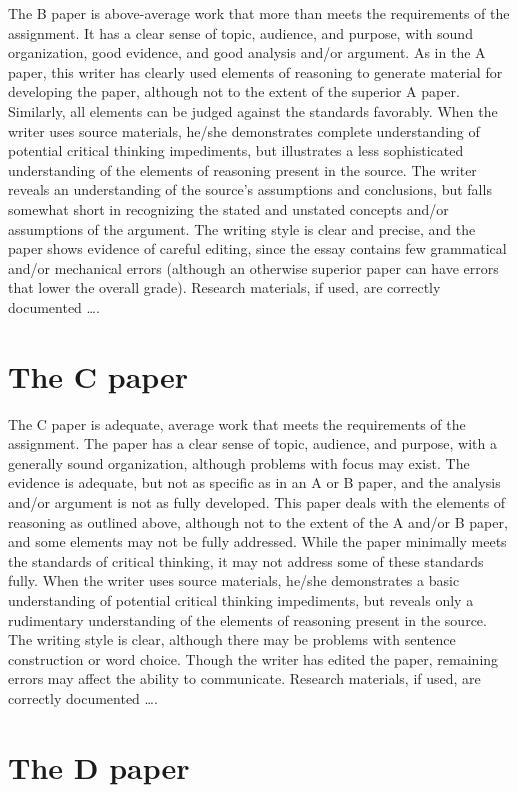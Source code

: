 The B paper is above-average work that more than meets the requirements of the assignment. It has a clear sense of topic, audience, and purpose, with sound organization, good evidence, and good analysis and/or argument. As in the A paper, this writer has clearly used elements of reasoning to generate material for developing the paper, although not to the extent of the superior A paper. Similarly, all elements can be judged against the standards favorably. When the writer uses source materials, he/she demonstrates complete understanding of potential critical thinking impediments, but illustrates a less sophisticated understanding of the elements of reasoning present in the source. The writer reveals an understanding of the source’s assumptions and conclusions, but falls somewhat short in recognizing the stated and unstated concepts and/or assumptions of the argument. The writing style is clear and precise, and the paper shows evidence of careful editing, since the essay contains few grammatical and/or mechanical errors (although an otherwise superior paper can have errors that lower the overall grade). Research materials, if used, are correctly documented \dots.
\section{The C paper}
The C paper is adequate, average work that meets the requirements of the assignment. The paper has a clear sense of topic, audience, and purpose, with a generally sound organization, although problems with focus may exist. The evidence is adequate, but not as specific as in an A or B paper, and the analysis and/or argument is not as fully developed. This paper deals with the elements of reasoning as outlined above, although not to the extent of the A and/or B paper, and some elements may not be fully addressed. While the paper minimally meets the standards of critical thinking, it may not address some of these standards fully. When the writer uses source materials, he/she demonstrates a basic understanding of potential critical thinking impediments, but reveals only a rudimentary understanding of the elements of reasoning present in the source. The writing style is clear, although there may be problems with sentence construction or word choice. Though the writer has edited the paper, remaining errors may affect the ability to communicate. Research materials, if used, are correctly documented \dots.

\section{The D paper}

